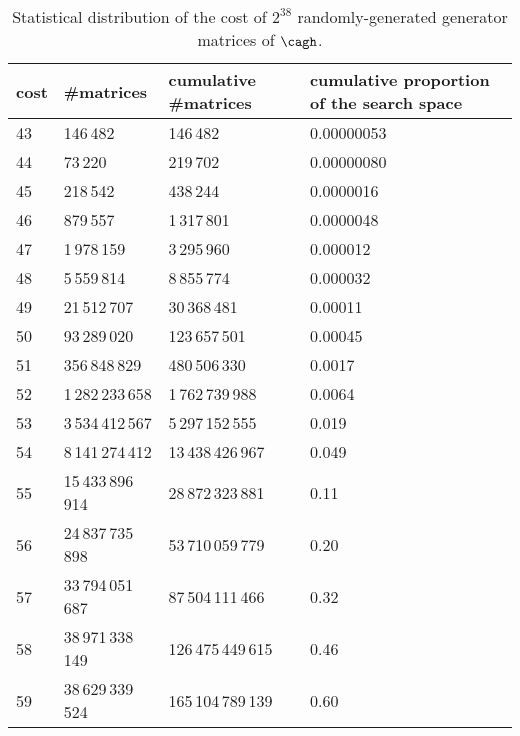 \begin{table}[!htb]
\caption{Statistical distribution of the cost of $2^{38}$ randomly-generated generator matrices of $\cagh$.
\label{tbl:randomsearch}}
\begin{center}
\begin{tabularx}{\textwidth}{l X X X}
\toprule
cost & \#matrices & cumulative \#matrices & cumulative proportion of the search space \\
\midrule
43	& 146\,482 &	146\,482	& 0.00000053 \\

44	& 73\,220	& 219\,702	& 0.00000080 \\

45	& 218\,542 &	438\,244	& 0.0000016 \\

46	& 879\,557 &	1\,317\,801	& 0.0000048 \\

47	& 1\,978\,159 &	3\,295\,960	& 0.000012 \\

48	& 5\,559\,814 &	8\,855\,774	& 0.000032 \\

49	& 21\,512\,707 &	30\,368\,481 &	0.00011 \\

50	& 93\,289\,020	& 123\,657\,501	& 0.00045 \\

51	& 356\,848\,829	& 480\,506\,330	& 0.0017 \\

52	& 1\,282\,233\,658 &	1\,762\,739\,988	& 0.0064 \\

53	& 3\,534\,412\,567 &	5\,297\,152\,555	& 0.019 \\

54	& 8\,141\,274\,412 &	13\,438\,426\,967	& 0.049 \\

55	& 15\,433\,896\,914 &	28\,872\,323\,881	& 0.11 \\

56	& 24\,837\,735\,898 &	53\,710\,059\,779	& 0.20 \\

57	& 33\,794\,051\,687 &	87\,504\,111\,466	& 0.32 \\

58	& 38\,971\,338\,149 &	126\,475\,449\,615 &	0.46 \\

59	& 38\,629\,339\,524 &	165\,104\,789\,139 &	0.60 \\
\bottomrule
\end{tabularx}
\end{center}
\end{table}

